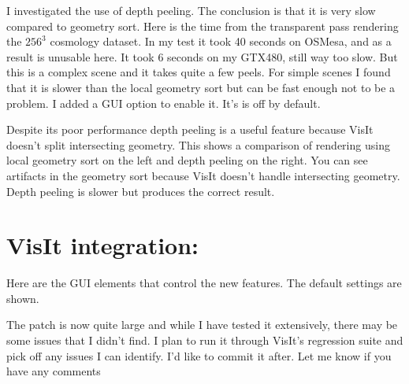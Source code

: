 \documentclass[a4paper,10pt]{report}
\begin{document}
I investigated the use of depth peeling. The conclusion is that it is very slow compared to geometry sort. Here is the time from the transparent pass rendering the $256^3$ cosmology dataset. In my test it took 40 seconds on OSMesa, and as a result is unusable here. It took 6 seconds on my GTX480, still way too slow. But this is a complex scene and it takes quite a few peels. For simple scenes I found that it is slower than the local geometry sort but can be fast enough not to be a problem. I added a GUI option to enable it. It's is off by default.


Despite its poor performance depth peeling is a useful feature  because VisIt doesn't split intersecting geometry. This shows a comparison of rendering using local geometry sort on the left and depth peeling on the right. You can see artifacts in the geometry sort because VisIt doesn't handle intersecting geometry. Depth peeling is slower but produces the correct result.

  


\section{VisIt integration:}
Here are the GUI elements that control the new features. The default settings are shown.










The patch is now quite large and while I have tested it extensively, there may be some issues that I didn't find. I plan to run it through VisIt's regression suite and pick off any issues I can identify. I'd like to commit it after. Let me know if you have any comments
\end{document}
